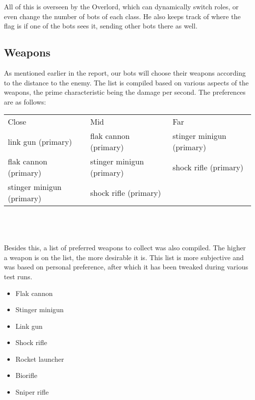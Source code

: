 All of this is overseen by the Overlord, which can dynamically switch roles, or even change the number of bots of each class. He also keeps track of where the flag is if one of the bots sees it, sending other bots there as well.

\subsection{Weapons}
As mentioned earlier in the report, our bots will choose their weapons according to the distance to the enemy. The list is compiled based on various aspects of the weapons, the prime characteristic being the damage per second. The preferences are as follows: \\

\begin{tabular}{| l | l | l |}
  Close & Mid & Far\\
  link gun (primary) & flak cannon (primary) & stinger minigun (primary)\\
  flak cannon (primary) & stinger minigun (primary) & shock rifle (primary)\\
  stinger minigun (primary) & shock rifle (primary) & \\
\end{tabular} \\
\\
\\
Besides this, a list of preferred weapons to collect was also compiled. The higher a weapon is on the list, the more desirable it is. This list is more subjective and was based on personal preference, after which it has been tweaked during various test runs.

\begin{itemize}
	\item Flak cannon
	\item Stinger minigun
	\item Link gun
	\item Shock rifle
	\item Rocket launcher
	\item Biorifle
	\item Sniper rifle
\end{itemize}